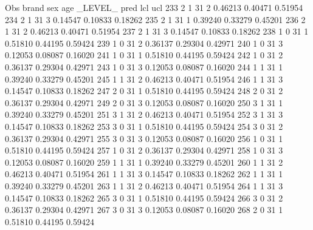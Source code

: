 \documentclass{article}
\begin{document}
\begin{Woutput}
 Obs    brand    sex    age    _LEVEL_      pred       lcl        ucl
 233      2       1      31       2       0.46213    0.40471    0.51954
 234      2       1      31       3       0.14547    0.10833    0.18262
 235      2       1      31       1       0.39240    0.33279    0.45201
 236      2       1      31       2       0.46213    0.40471    0.51954
 237      2       1      31       3       0.14547    0.10833    0.18262
 238      1       0      31       1       0.51810    0.44195    0.59424
 239      1       0      31       2       0.36137    0.29304    0.42971
 240      1       0      31       3       0.12053    0.08087    0.16020
 241      1       0      31       1       0.51810    0.44195    0.59424
 242      1       0      31       2       0.36137    0.29304    0.42971
 243      1       0      31       3       0.12053    0.08087    0.16020
 244      1       1      31       1       0.39240    0.33279    0.45201
 245      1       1      31       2       0.46213    0.40471    0.51954
 246      1       1      31       3       0.14547    0.10833    0.18262
 247      2       0      31       1       0.51810    0.44195    0.59424
 248      2       0      31       2       0.36137    0.29304    0.42971
 249      2       0      31       3       0.12053    0.08087    0.16020
 250      3       1      31       1       0.39240    0.33279    0.45201
 251      3       1      31       2       0.46213    0.40471    0.51954
 252      3       1      31       3       0.14547    0.10833    0.18262
 253      3       0      31       1       0.51810    0.44195    0.59424
 254      3       0      31       2       0.36137    0.29304    0.42971
 255      3       0      31       3       0.12053    0.08087    0.16020
 256      1       0      31       1       0.51810    0.44195    0.59424
 257      1       0      31       2       0.36137    0.29304    0.42971
 258      1       0      31       3       0.12053    0.08087    0.16020
 259      1       1      31       1       0.39240    0.33279    0.45201
 260      1       1      31       2       0.46213    0.40471    0.51954
 261      1       1      31       3       0.14547    0.10833    0.18262
 262      1       1      31       1       0.39240    0.33279    0.45201
 263      1       1      31       2       0.46213    0.40471    0.51954
 264      1       1      31       3       0.14547    0.10833    0.18262
 265      3       0      31       1       0.51810    0.44195    0.59424
 266      3       0      31       2       0.36137    0.29304    0.42971
 267      3       0      31       3       0.12053    0.08087    0.16020
 268      2       0      31       1       0.51810    0.44195    0.59424

\end{Woutput}
\end{document}

